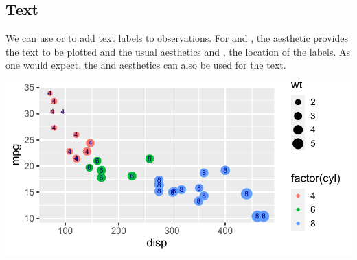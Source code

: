 \documentclass[krantz2]{krantz}\usepackage{knitr}
\begin{document}
\subsection{Text}\label{sec:plot:text}
We can use  or  to add text labels to observations. For  and , the aesthetic  provides the text to be plotted and the usual aesthetics  and , the location of the labels. As one would expect, the  and  aesthetics can also be used for the text.

\begin{knitrout}\footnotesize
{}\color{fgcolor}\begin{kframe}
\begin{alltt}
\hlstd{(}  \hlstd{(}   
                           \hlstd{=} 
                           
                            \hlopt{+}
  \hlstd{()} \hlopt{+}
  \hlstd{()} \hlopt{+}
  \hlstd{(} \hlstd{=} \hlstd{,}  \hlstd{=} \hlstd{)}
\end{alltt}
\end{kframe}

{\centering \includegraphics[width=.7\textwidth]{figure/pos-text-plot-01-1} 

}


\end{knitrout}
\end{document}
